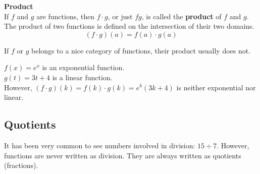 \documentclass{ximera}
\begin{document}
\begin{template}  \textbf{\textcolor{blue!55!black}{Product}} \\


If  $f$ and $g$ are functions, then $f \cdot g$, or just $f g$, is called the \textbf{\textcolor{green!50!black}{product}} of $f$ and $g$. \\

The product of two functions is defined on the intersection of their two domains. \\


\[ (f \cdot g)(a) = f(a) \cdot g(a)  \]



\end{template}



\begin{warning}

If $f$ or $g$ belongs to a nice category of functions, their product usually does not.

\end{warning}





\begin{example}

$f(x) = e^x$ is an exponential function. \\
$g(t) = 3 t + 4$ is a linear function. \\

However, $(f \cdot g)(k) = f(k) \cdot g(k) = e^k (3 k + 4)$ is neither exponential nor linear.

\end{example}























\subsection*{Quotients}



It has been very common to see numbers involved in division: $15 \div 7$. However, functions are never written as division. They are always written as quotients (fractions).
\end{document}
